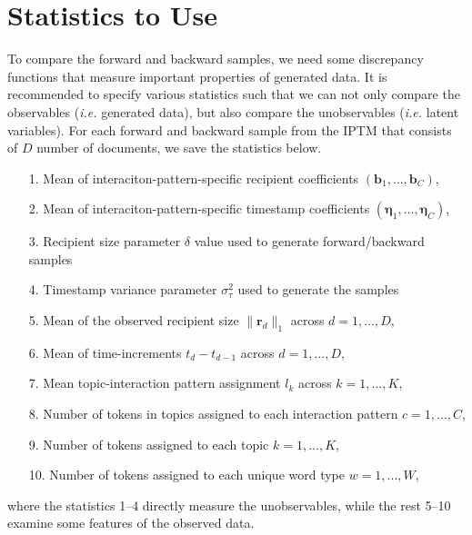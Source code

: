 \documentclass[a4paper]{article}
\begin{document}
\section{Statistics to Use}
To compare the forward and backward samples, we need some discrepancy functions that measure important properties of generated data. It is recommended to specify various statistics such that we can not only compare the observables (\textit{i.e.} generated data), but also compare the unobservables (\textit{i.e.} latent variables).  For each forward and backward sample from the IPTM that consists of $D$ number of documents, we save the statistics below.
      \begin{itemize}
      	\item[1.] Mean of interaciton-pattern-specific recipient coefficients $(\boldsymbol{b}_1,\ldots,\boldsymbol{b}_C)$,
      	\item[2.] Mean of interaciton-pattern-specific timestamp coefficients $(\boldsymbol{\eta}_1,\ldots,\boldsymbol{\eta}_C)$,
      	\item[3.] Recipient size parameter $\delta$ value used to generate forward/backward samples
      	\item[4.] Timestamp variance parameter $\sigma_\tau^2$ used to generate the samples
        \item[5.] Mean of the observed recipient size $ \lVert\boldsymbol{r}_d\rVert_1 $ across $d=1,...,D$,
      	\item[6.] Mean of time-increments $t_d-t_{d-1}$ across $d=1,...,D$,
      	\item[7.] Mean topic-interaction pattern assignment $l_k$ across $k=1,...,K$, 
      	\item[8.] Number of tokens in topics assigned to each interaction pattern $c=1,...,C$,
      	\item[9.] Number of tokens assigned to each topic $k=1,...,K$, 
       \item[10.] Number of tokens assigned to each unique word type $w=1,...,W$,
      	 \end{itemize}
where the statistics 1--4 directly measure the unobservables, while the rest 5--10 examine some features of the observed data.
\end{document}
